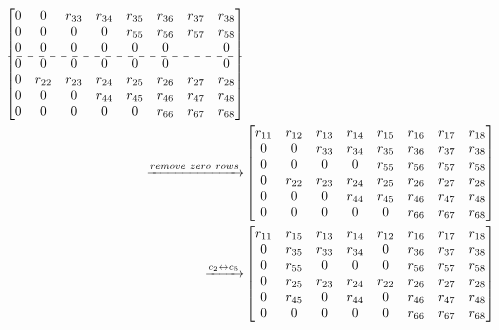 \documentclass[12pt]{article}
\begin{document}
\begin{align*}
\begin{bmatrix}
 0      & 0      & r_{33} & r_{34} & r_{35} & r_{36} & r_{37} & r_{38}\\
 0      & 0      & 0      & 0      & r_{55} & r_{56} & r_{57} & r_{58}\\
 0      & 0      & 0      & 0      & 0      & 0      &        & 0     \\
 \cdashline{1-8}
 0      & 0      & 0      & 0      & 0      & 0      &        & 0     \\
 0      & r_{22} & r_{23} & r_{24} & r_{25} & r_{26} & r_{27} & r_{28}\\
 0      & 0      & 0      & r_{44} & r_{45} & r_{46} & r_{47} & r_{48}\\
 0      & 0      & 0      & 0      & 0      & r_{66} & r_{67} & r_{68}\\
\end{bmatrix}\\
\xrightarrow{remove\ zero\ rows}
&\begin{bmatrix}
 r_{11} & r_{12} & r_{13} & r_{14} & r_{15} & r_{16} & r_{17} & r_{18}\\
 0      & 0      & r_{33} & r_{34} & r_{35} & r_{36} & r_{37} & r_{38}\\
 0      & 0      & 0      & 0      & r_{55} & r_{56} & r_{57} & r_{58}\\
 0      & r_{22} & r_{23} & r_{24} & r_{25} & r_{26} & r_{27} & r_{28}\\
 0      & 0      & 0      & r_{44} & r_{45} & r_{46} & r_{47} & r_{48}\\
 0      & 0      & 0      & 0      & 0      & r_{66} & r_{67} & r_{68}\\
\end{bmatrix}\\
\xrightarrow{c_{2} \leftrightarrow c_{5}}
&\begin{bmatrix}
 r_{11} & r_{15} & r_{13} & r_{14} &  r_{12} & r_{16} & r_{17} & r_{18}\\
 0      & r_{35} & r_{33} & r_{34} &  0      & r_{36} & r_{37} & r_{38}\\
 0      & r_{55} & 0      & 0      &  0      & r_{56} & r_{57} & r_{58}\\
 0      & r_{25} & r_{23} & r_{24} &  r_{22} & r_{26} & r_{27} & r_{28}\\
 0      & r_{45} & 0      & r_{44} &  0      & r_{46} & r_{47} & r_{48}\\
 0      & 0      & 0      & 0      &  0      & r_{66} & r_{67} & r_{68}\\
\end{bmatrix}
\end{align*}
\end{document}
